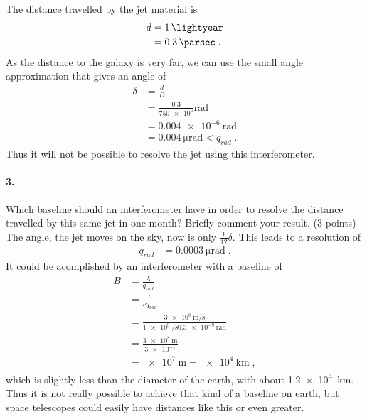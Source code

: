 \documentclass[11pt,a4paper,twoside]{article}
\begin{document}
The distance travelled by the jet material is 
\begin{align}
    d   &= \SI{1}{\lightyear} \\
        &= \SI{0.3}{\parsec}\;.
\end{align}
As the distance to the galaxy is very far, we can use the small angle
approximation that gives an angle of 
\begin{align}
    \delta  &= \frac{d}{D} \\
            &= \frac{0.3}{\num{750e6}}\si{\radian} \\
            &= \SI{0.004e-6}{\radian} \\
            &= \SI{0.004}{\micro\radian} < q_{rad} \;.
\end{align}
Thus it will not be possible to resolve the jet using this interferometer.

\paragraph{3.} Which baseline should an interferometer have in order to resolve
the distance travelled by this same jet in one month? Briefly comment your
result. (3 points) \\

The angle, the jet moves on the sky, now is only $\frac{1}{12}\delta$. This
leads to a resolution of 
\begin{align}
    q_{rad}     &= \SI{0.0003}{\micro\radian}\;.
\end{align}
It could be acomplished by an interferometer with a baseline of
\begin{align}
    B   &= \frac{\lambda}{q_{rad}} \\
        &= \frac{c}{\nu q_{rad}} \\
        &= \frac{\SI{3e8}{\meter\per\second}}{\SI{1e9}{\per\second} \SI{0.3e-9}{\radian}} \\
        &= \frac{\SI{3e8}{\meter}}{\num{3e-1}} \\
        &= \SI{e7}{\meter} = \SI{e4}{\kilo\meter} \;,
\end{align}
which is slightly less than the diameter of the earth, with about
\SI{1.2e4}{\kilo\meter}.  Thus it is not really possible to achieve that kind
of a baseline on earth, but space telescopes could easily have distances like
this or even greater.
\end{document}
